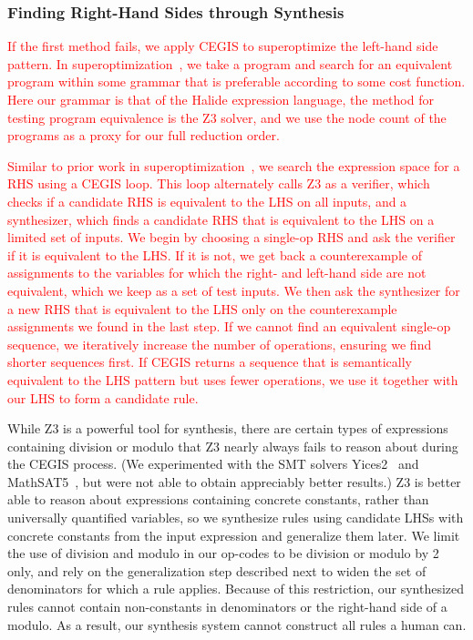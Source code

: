 \documentclass[acmsmall,review]{acmart}\settopmatter{printfolios=true,printccs=false,printacmref=false}
\newcommand{\modified}[1]{\textcolor{red}{{#1}}}
\begin{document}
\subsubsection{Finding Right-Hand Sides through Synthesis}
\label{sec:rhssynthesis}
\modified{If the first method fails, we apply CEGIS to superoptimize the left-hand side pattern.
In superoptimization~\cite{massalin1987superoptimizer}, we take a program and search 
for an equivalent program within some grammar that is preferable according 
to some cost function. Here our grammar is that of the Halide expression language, 
the method for testing program equivalence is the Z3 solver, and we use the node
count of the programs as a proxy for our full reduction order.}

\modified{Similar to prior work in superoptimization~\cite{regehr2018superoptimization, mangpo2016superoptimization},
we search the expression space for a RHS using a CEGIS loop. This loop alternately calls Z3 as a
verifier, which checks if a candidate RHS is equivalent to the LHS on all inputs, 
and a synthesizer, which finds a candidate RHS that is equivalent to the LHS on
a limited set of inputs.
We begin by choosing a single-op
RHS and ask the verifier if it is equivalent to the LHS. If it is not, we get back 
a counterexample of assignments to the variables for which the right- and left-hand side are 
not equivalent, which we keep as a set of test inputs. 
We then ask the synthesizer for a new RHS that is equivalent to the LHS 
only on the counterexample assignments we found in the last step. 
If we cannot find an equivalent single-op sequence,
we iteratively increase the number of operations, ensuring we find shorter sequences
first.  If CEGIS returns a sequence that is semantically equivalent to the LHS pattern but uses fewer
operations, we use it together with our LHS to form a candidate rule.}

While Z3 is a powerful tool for synthesis, there are certain types of expressions 
containing division or modulo that Z3 nearly always fails to reason about during the CEGIS process. (We experimented with the SMT solvers Yices2~\cite{jovanovic2017solving} and MathSAT5~\cite{mathsat5}, but were not able to obtain appreciably better results.)
Z3 is better able to reason about expressions containing concrete constants, rather than
universally quantified variables, so we synthesize rules using candidate LHSs with 
concrete constants from the input expression and generalize them later.
We limit the use of division and modulo in our op-codes to be division
or modulo by 2 only, and rely on the generalization step described next to
widen the set of denominators for which a rule applies.  Because of this
restriction, our synthesized rules cannot contain non-constants in denominators
or the right-hand side of a modulo.  As a result, our synthesis system cannot
construct all rules a human can.
\end{document}
